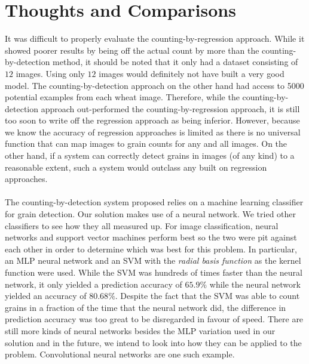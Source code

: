 \section{Thoughts and Comparisons}
It was difficult to properly evaluate the counting-by-regression approach. While it showed poorer results by being off the actual count by more than the counting-by-detection method, it should be noted that it only had a dataset consisting of $12$ images. Using only $12$ images would definitely not have built a very good model. The counting-by-detection approach on the other hand had access to 5000 potential examples from each wheat image. Therefore, while the counting-by-detection approach out-performed the counting-by-regression approach, it is still too soon to write off the regression approach as being inferior. However, because we know the accuracy of regression approaches is limited as there is no universal function that can map images to grain counts for any and all images. On the other hand, if a system can correctly detect grains in images (of any kind) to a reasonable extent, such a system would outclass any built on regression approaches.\\ \\
%
The counting-by-detection system proposed relies on a machine learning classifier for grain detection. Our solution makes use of a neural network. We tried other classifiers to see how they all measured up. For image classification, neural networks and support vector machines perform best so the two were pit against each other in order to determine which was best for this problem. In particular, an MLP neural network and an SVM with the \textit{radial basis function} as the kernel function were used. While the SVM was hundreds of times faster than the neural network, it only yielded a prediction accuracy of $65.9\%$ while the neural network yielded an accuracy of $80.68\%$. Despite the fact that the SVM was able to count grains in a fraction of the time that the neural network did, the difference in prediction accuracy was too great to be disregarded in favour of speed. There are still more kinds of neural networks besides the MLP variation used in our solution and in the future, we intend to look into how they can be applied to the problem. Convolutional neural networks are one such example.\\ \\
%
